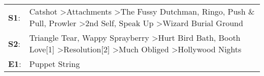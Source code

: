\begin{supertabular}{p{0.03\textwidth}p{0.92\textwidth}}
 \textbf{S1}:  &  Catshot\textsuperscript{} \textgreater \enspace Attachments\textsuperscript{} \textgreater \enspace The Fussy Dutchman\textsuperscript{}, \enspace Ringo\textsuperscript{}, \enspace Push \& Pull\textsuperscript{}, \enspace Prowler\textsuperscript{} \textgreater \enspace 2nd Self\textsuperscript{}, \enspace Speak Up\textsuperscript{} \textgreater \enspace Wizard Burial Ground\textsuperscript{}  \enspace  \\
 \textbf{S2}:  &                                                           Triangle Tear\textsuperscript{}, \enspace Wappy Sprayberry\textsuperscript{} \textgreater \enspace Hurt Bird Bath\textsuperscript{}, \enspace Booth Love[1]\textsuperscript{} \textgreater \enspace Resolution[2]\textsuperscript{} \textgreater \enspace Much Obliged\textsuperscript{} \textgreater \enspace Hollywood Nights\textsuperscript{}  \enspace  \\
 \textbf{E1}:  &                                                                                                                                                                                                                                                                                                                                                                             Puppet String\textsuperscript{}  \enspace  \\
\end{supertabular}
